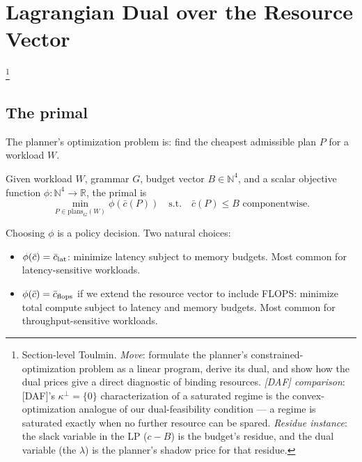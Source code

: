 \section{Lagrangian Dual over the Resource Vector}
\label{sec:lagrangian}\footnote{Section-level Toulmin. \emph{Move}: formulate the planner's constrained-optimization problem as a linear program, derive its dual, and show how the dual prices give a direct diagnostic of binding resources. \emph{[DAF] comparison}: [DAF]'s $\kappa^\perp = \{0\}$ characterization of a saturated regime is the convex-optimization analogue of our dual-feasibility condition --- a regime is saturated exactly when no further resource can be spared. \emph{Residue instance}: the slack variable in the LP ($c - B$) is the budget's residue, and the dual variable (the $\lambda$) is the planner's shadow price for that residue.}

\subsection{The primal}

The planner's optimization problem is: find the cheapest
admissible plan $P$ for a workload $W$.

\begin{definition}
  \label{def:primal}
  Given workload $W$, grammar $G$, budget vector
  $B \in \mathbb{N}^4$, and a scalar objective function
  $\phi : \mathbb{N}^4 \to \mathbb{R}$, the primal is
  \begin{equation}
    \min_{P \in \mathrm{plans}_G(W)} \phi(\bar{c}(P))
    \quad \text{s.t.} \quad \bar{c}(P) \leq B
    \text{ componentwise}.
  \end{equation}
\end{definition}

Choosing $\phi$ is a policy decision. Two natural
choices:

\begin{itemize}[nosep]
  \item $\phi(\bar{c}) = \bar{c}_{\operatorname{lat}}$: minimize
    latency subject to memory budgets. Most common
    for latency-sensitive workloads.
  \item $\phi(\bar{c}) = \bar{c}_{\operatorname{flops}}$ if we
    extend the resource vector to include FLOPS:
    minimize total compute subject to latency and
    memory budgets. Most common for
    throughput-sensitive workloads.
\end{itemize}

